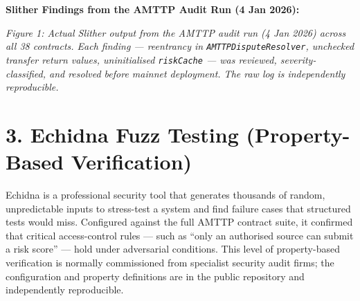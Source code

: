 \documentclass[11pt,a4paper]{article}
\begin{document}
\vspace{0.3cm}
\noindent\textbf{Slither Findings from the AMTTP Audit Run (4 Jan 2026):}

\vspace{0.2cm}
\noindent{}
\vspace{0.2cm}

\noindent\textit{Figure 1: Actual Slither output from the AMTTP audit run (4 Jan 2026) across all 38 contracts. Each finding --- reentrancy in \texttt{AMTTPDisputeResolver}, unchecked transfer return values, uninitialised \texttt{riskCache} --- was reviewed, severity-classified, and resolved before mainnet deployment. The raw log is independently reproducible.}

\section*{3. Echidna Fuzz Testing (Property-Based Verification)}
Echidna is a professional security tool that generates thousands of random, unpredictable inputs to stress-test a system and find failure cases that structured tests would miss. Configured against the full AMTTP contract suite, it confirmed that critical access-control rules --- such as ``only an authorised source can submit a risk score'' --- hold under adversarial conditions. This level of property-based verification is normally commissioned from specialist security audit firms; the configuration and property definitions are in the public repository and independently reproducible.
\end{document}
